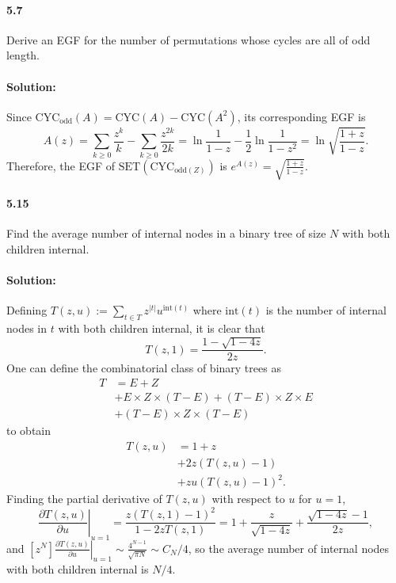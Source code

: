 \documentclass{article}
\begin{document}
\paragraph{5.7} Derive an EGF for the number of permutations whose cycles are
all of odd length.

\paragraph{Solution:} Since $\mathrm{CYC}_{\mathrm{odd}}(A) = \mathrm{CYC}(A) -
\mathrm{CYC}(A^2)$, its corresponding EGF is \begin{equation*}
  A(z) = \sum_{k \geq 0} \frac{z^k}{k} - \sum_{k \geq 0} \frac{z^{2k}}{2k}
    = \ln\frac{1}{1 - z} - \frac{1}{2}\ln\frac{1}{1 - z^2}
    = \ln\sqrt{\frac{1 + z}{1 - z}}.
\end{equation*} Therefore, the EGF of
$\mathrm{SET}(\mathrm{CYC}_{\mathrm{odd}(Z)})$ is $e^{A(z)} =
\sqrt{\frac{1 + z}{1 - z}}$.

\paragraph{5.15} Find the average number of internal nodes in a binary tree of
size $N$ with both children internal.

\paragraph{Solution:} Defining $T(z, u) := \sum_{t \in T} z^{|t|}
u^{\mathrm{int}(t)}$ where $\mathrm{int}(t)$ is the number of internal nodes in
$t$ with both children internal, it is clear that \begin{equation*}
  T(z, 1) = \frac{1 - \sqrt{1 - 4z}}{2z}.
\end{equation*} One can define the combinatorial class of binary trees as
\begin{align*}
  T &= E + Z \\
    &+ E \times Z \times (T - E) + (T - E) \times Z \times E \\
    &+ (T - E) \times Z \times (T - E)
\end{align*} to obtain \begin{align*}
  T(z, u) &= 1 + z \\
    &+ 2z(T(z, u) - 1) \\
    &+ zu(T(z, u) - 1)^2.
\end{align*} Finding the partial derivative of $T(z, u)$ with respect to $u$
for $u = 1$, \begin{equation*}
  \left.\frac{\partial T(z, u)}{\partial u}\right|_{u = 1}
    = \frac{z(T(z, 1) - 1)^2}{1 - 2zT(z, 1)}
    = 1 + \frac{z}{\sqrt{1 - 4z}} + \frac{\sqrt{1 - 4z} - 1}{2z},
\end{equation*} and $[z^N]\left.\frac{\partial T(z, u)}{\partial u}\right
  |_{u = 1} \sim \frac{4^{N - 1}}{\sqrt{\pi N}} \sim C_N/4$, so the average
number of internal nodes with both children internal is $N/4$.
\end{document}
